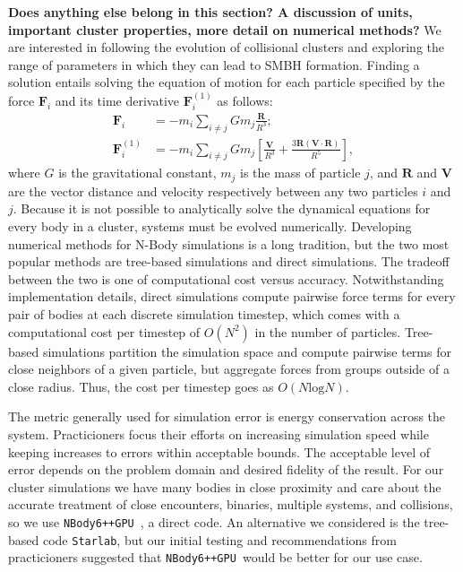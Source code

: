 \documentclass[preprint1]{aastex}
\newcommand\nbody{\texttt{NBody6++GPU }}
\numberwithin{equation}{section}
\begin{document}
\textbf{Does anything else belong in this section?  A discussion of units, important cluster properties, more detail on numerical methods?}
We are interested in following the evolution of collisional clusters and exploring the range of parameters in which they can lead to \ac{SMBH} formation. Finding a solution entails solving the equation of motion for each particle specified by the force $\mathbf{F}_{i}$ and its time derivative $\mathbf{F}^{(1)}_{i}$ as follows:
\begin{subequations}
    \begin{align}
    \mathbf{F}_{i} &= -m_{i}\sum_{i \neq j} Gm_{j} \frac{\mathbf{R}}{R^3}; \\
    \mathbf{F}^{(1)}_{i} &=  -m_{i}\sum_{i \neq j} Gm_{j} \left[ \frac{\mathbf{V}}{R^3} + \frac{3\mathbf{R}(\mathbf{V} \cdot \mathbf{R})}{R^5}\right],
    \end{align}
    \label{eqn:gravmotion}
\end{subequations}
where $G$ is the gravitational constant, $m_j$ is the mass of particle $j$, and $\mathbf{R}$ and $\mathbf{V}$ are the vector distance and velocity respectively between any two particles $i$ and $j$.  Because it is not possible to analytically solve the dynamical equations for every body in a cluster, systems must be evolved numerically. Developing numerical methods for N-Body simulations is a long tradition, but the two most popular methods are tree-based simulations and direct simulations. The tradeoff between the two is one of computational cost versus accuracy. Notwithstanding implementation details, direct simulations compute pairwise force terms for every pair of bodies at each discrete simulation timestep, which comes with a computational cost per timestep of $O(N^2)$ in the number of particles.  Tree-based simulations partition the simulation space and compute pairwise terms for close neighbors of a given particle, but aggregate forces from groups outside of a close radius. Thus, the cost per timestep goes as $O(N\mathrm{log}N)$.

The metric generally used for simulation error is energy conservation across the system. Practicioners focus their efforts on increasing simulation speed while keeping increases to errors within acceptable bounds. The acceptable level of error depends on the problem domain and desired fidelity of the result.  For our cluster simulations we have many bodies in close proximity and care about the accurate treatment of close encounters, binaries, multiple systems, and collisions, so we use \nbody, a direct code.  An alternative we considered is the tree-based code \texttt{Starlab}, but our initial testing and recommendations from practicioners suggested that \nbody would be better for our use case.
\end{document}
